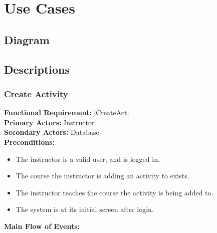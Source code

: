 \documentclass{article}
\begin{document}
\section{Use Cases}
\subsection{Diagram}
\subsection{Descriptions}
\subsubsection{Create Activity}
\textbf{Functional Requirement:} \ref{CreateAct} \\
\textbf{Primary Actors:} Instructor \\
\textbf{Secondary Actors:} Database \\
\textbf{Preconditions:}
\begin{itemize}
	\item The instructor is a valid user, and is logged in.
	\item The course the instructor is adding an activity to exists.
	\item The instructor teaches the course the activity is being added to.
	\item The system is at its initial screen after login.
\end{itemize}
\textbf{Main Flow of Events:}
\end{document}
